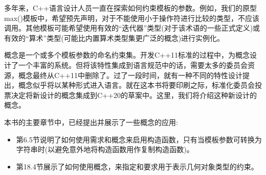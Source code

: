 多年来，C++语言设计人员一直在探索如何约束模板的参数。例如，我们的原型max()模板中，希望预先声明，对于不能使用小于操作符进行比较的类型，不应该调用。其他模板可能希望使用有效的“迭代器”类型(对于该术语的一些正式定义)或有效的“算术”类型(可能比内置算术类型集更广泛的概念)进行实例化。

概念是一个或多个模板参数的命名约束集。开发C++11标准的过程中，为概念设计了一个丰富的系统。但将该特性集成到语言规范中的话，需要太多的委员会资源，概念最终从C++11中删除了。过了一段时间，就有一种不同的特性设计提出，概念似乎将以某种形式进入语言。就在这本书将要印刷之际，标准化委员会投票决定将新设计的概念集成到C++20的草案中。这里，我们将介绍这种新设计的概念。

本书的主要章节中，已经提出并展示了一些概念的应用:

\begin{itemize}
\item 
第6.5节说明了如何使用需求和概念来启用构造函数，只有当模板参数可转换为字符串时(以避免意外地将构造函数用作复制构造函数)。

\item 
第18.4节展示了如何使用概念，来指定和要求用于表示几何对象类型的约束。
\end{itemize}